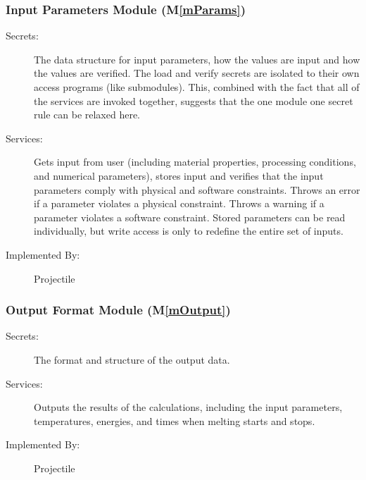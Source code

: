 \documentclass[12pt]{article}
\newcommand{\mref}[1]{M\ref{#1}}
\begin{document}
\subsubsection{Input Parameters Module (\mref{mParams})}

\begin{description}
\item[Secrets:] The data structure for input parameters, how the
values are input and how the values are verified.  The load and verify secrets
are isolated to their own access programs (like submodules).  This, combined
with the fact that all of the services are invoked together, suggests that the
one module one secret rule can be relaxed here.
\item[Services:] Gets input from user (including material properties, processing
  conditions, and numerical parameters), stores input and verifies that the
  input parameters comply with physical and software constraints. Throws an
  error if a parameter violates a physical constraint. Throws a warning if a
  parameter violates a software constraint.  Stored parameters can be read
  individually, but write access is only to redefine the entire set of inputs.
\item[Implemented By:] Projectile
\end{description}



\subsubsection{Output Format Module (\mref{mOutput})}

\begin{description}
\item[Secrets:] The format and structure of the output data.
\item[Services:] Outputs the results of the calculations, including the input
  parameters, temperatures, energies, and times when melting starts and stops.
\item[Implemented By:] Projectile
\end{description} 
\end{document}
